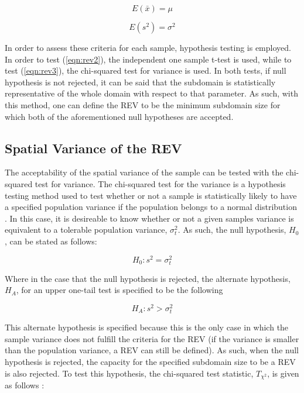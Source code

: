 \begin{equation}
E\left(\bar{x}\right) = \mu
\label{eqn:rev2}
\end{equation}

\begin{equation}
E\left(s^2\right) = \sigma^2
\label{eqn:rev3}
\end{equation}

In order to assess these criteria for each sample, hypothesis testing is employed. In order to test (\ref{eqn:rev2}), the independent one sample t-test is used, while to test (\ref{eqn:rev3}), the chi-squared test for variance is used. In both tests, if null hypothesis is not rejected, it can be said that the subdomain is statistically representative of the whole domain with respect to that parameter. As such, with this method, one can define the REV to be the minimum subdomain size for which both of the aforementioned null hypotheses are accepted.

\subsection{Spatial Variance of the REV}

The acceptability of the spatial variance of the sample can be tested with the chi-squared test for variance. The chi-squared test for the variance is a hypothesis testing method used to test whether or not a sample is statistically likely to have a specified population variance if the population belongs to a normal distribution \citep{walpole_probability_2007}. In this case, it is desireable to know whether or not a given samples variance is equivalent to a tolerable population variance, $\sigma^2_t$. As such, the null hypothesis, $H_0$, can be stated as follows:

\begin{equation}
H_0:s^2=\sigma_t^2
\label{eqn:rev4}
\end{equation}

Where in the case that the null hypothesis is rejected, the alternate hypothesis, $H_A$, for an upper one-tail test is specified to be the following

\begin{equation}
H_A:s^2>\sigma_t^2
\label{eqn:rev5}
\end{equation}

This alternate hypothesis is specified because this is the only case in which the sample variance does not fulfill the criteria for the REV (if the variance is smaller than the population variance, a REV can still be defined). As such, when the null hypothesis is rejected, the capacity for the specified subdomain size to be a REV is also rejected. To test this hypothesis, the chi-squared test statistic, $T_{\chi^2}$, is given as follows \citep{walpole_probability_2007}:

